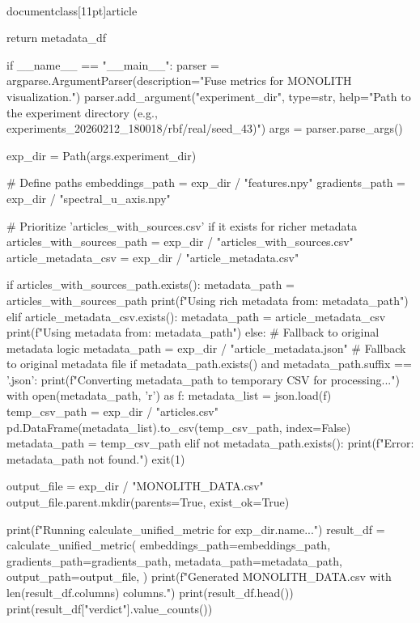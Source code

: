 \\documentclass[11pt]{article}
\begin{document}
\begin{CodeBlock}
    return metadata_df

if __name__ == "__main__":
    parser = argparse.ArgumentParser(description="Fuse metrics for MONOLITH visualization.")
    parser.add_argument("experiment_dir", type=str, help="Path to the experiment directory (e.g., experiments_20260212_180018/rbf/real/seed_43)")
    args = parser.parse_args()

    exp_dir = Path(args.experiment_dir)

    # Define paths
    embeddings_path = exp_dir / "features.npy"
    gradients_path = exp_dir / "spectral_u_axis.npy"
    
    # Prioritize 'articles_with_sources.csv' if it exists for richer metadata
    articles_with_sources_path = exp_dir / "articles_with_sources.csv"
    article_metadata_csv = exp_dir / "article_metadata.csv"
    
    if articles_with_sources_path.exists():
        metadata_path = articles_with_sources_path
        print(f"Using rich metadata from: {metadata_path}")
    elif article_metadata_csv.exists():
        metadata_path = article_metadata_csv
        print(f"Using metadata from: {metadata_path}")
    else: # Fallback to original metadata logic
        metadata_path = exp_dir / "article_metadata.json" # Fallback to original metadata file
        if metadata_path.exists() and metadata_path.suffix == '.json':
            print(f"Converting {metadata_path} to temporary CSV for processing...")
            with open(metadata_path, 'r') as f:
                metadata_list = json.load(f)
            temp_csv_path = exp_dir / "articles.csv"
            pd.DataFrame(metadata_list).to_csv(temp_csv_path, index=False)
            metadata_path = temp_csv_path
        elif not metadata_path.exists():
            print(f"Error: {metadata_path} not found.")
            exit(1)

    output_file = exp_dir / "MONOLITH_DATA.csv"
    output_file.parent.mkdir(parents=True, exist_ok=True)

    print(f"Running calculate_unified_metric for {exp_dir.name}...")
    result_df = calculate_unified_metric(
        embeddings_path=embeddings_path,
        gradients_path=gradients_path,
        metadata_path=metadata_path,
        output_path=output_file,
    )
    print(f"Generated MONOLITH_DATA.csv with {len(result_df.columns)} columns.")
    print(result_df.head())
    print(result_df["verdict"].value_counts())

\end{CodeBlock}
\end{document}
